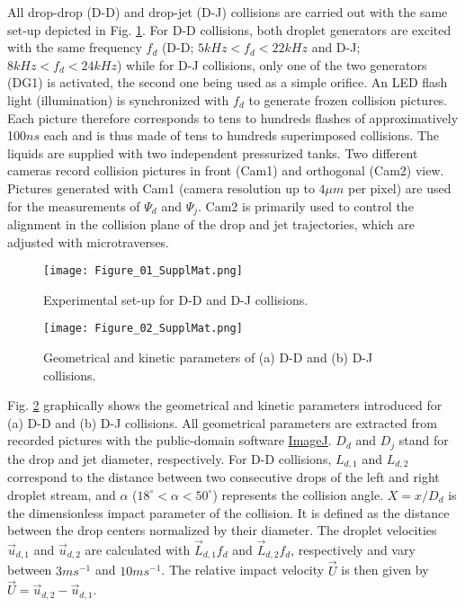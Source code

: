 \documentclass{article}
\begin{document}
All drop-drop (D-D) and drop-jet (D-J) collisions are carried out with the same set-up depicted in  Fig. \ref{app_fig01}. For D-D collisions, both droplet generators \citep{ref:Brenn1996} are excited  with the same frequency $f_d$ (D-D; $5 kHz<f_d<22 kHz$ and D-J; $8 kHz<f_{d}<24 kHz$) while for D-J collisions, only one of the two generators (DG1) is activated, the second one being used as a simple orifice. An LED flash light (illumination) is synchronized with $f_d$  to generate frozen collision pictures. {Each picture therefore corresponds to tens to hundreds flashes of approximatively 100$ns$ each and is thus made of tens to hundreds superimposed collisions.} The liquids are supplied with two independent pressurized tanks. Two different cameras record collision pictures in front (Cam1) and orthogonal (Cam2) view. Pictures generated with Cam1 (camera resolution up to $4\mu m$ per pixel) are used for the measurements of $\Psi_d$ and $\Psi_j$.  Cam2 is primarily used to control the alignment in the collision plane of the drop and jet trajectories, which are adjusted with microtraverses.
\begin{figure}
\centering
\texttt{[image: Figure\_01\_SupplMat.png]}
\caption{\label{app_fig01} Experimental set-up for D-D and D-J collisions. }
\end{figure}
\begin{figure}
\centering
\texttt{[image: Figure\_02\_SupplMat.png]}
\caption{\label{app_fig02} Geometrical and kinetic parameters of (a) D-D and (b) D-J collisions.}
\end{figure}

Fig. \ref{app_fig02} graphically shows the geometrical and kinetic parameters introduced for (a) D-D  and (b) D-J  collisions. All geometrical parameters are extracted from recorded pictures with the public-domain software \href{https://imagej.nih.gov/ij/}{ImageJ}. $D_d$ and $D_j$ stand for the drop and jet diameter, respectively. For D-D collisions, $L_{d,1}$ and $L_{d,2}$ correspond to the distance between two consecutive drops of the left and right droplet stream, and $\alpha$ ($18^\circ < \alpha < 50^\circ$) represents the collision angle. $X=x/D_d$ is the dimensionless impact parameter of the collision. It is defined as the distance between the drop centers normalized by their diameter.  The droplet velocities $\vec{u}_{d,1}$ and $\vec{u}_{d,2}$ are calculated with $\vec{L}_{d,1}f_d$ and $\vec{L}_{d,2}f_d$, respectively and vary between $3ms^{-1}$ and $10ms^{-1}$. The relative impact velocity $\vec{U}$ is then given by  $\vec{U}=\vec{u}_{d,2}-\vec{u}_{d,1}$.
\end{document}
